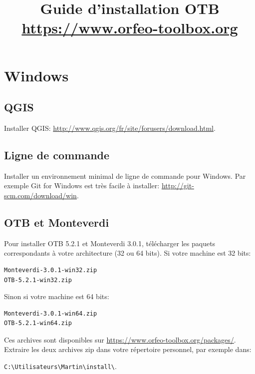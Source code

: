\documentclass[10pt,a4paper]{article}
\title{Guide d'installation OTB\\
  {\small\url{https://www.orfeo-toolbox.org}}
}
\begin{document}
\maketitle

\tableofcontents

\section{Windows}

\subsection{QGIS}
Installer QGIS: \url{http://www.qgis.org/fr/site/forusers/download.html}.
\subsection{Ligne de commande}
Installer un environnement minimal de ligne de commande pour Windows. Par exemple
Git for Windows est très facile à installer:
\url{http://git-scm.com/download/win}.

\subsection{OTB et Monteverdi}
Pour installer OTB 5.2.1 et Monteverdi 3.0.1, télécharger les paquets
correspondants à votre architecture (32 ou 64 bits). Si votre machine est 32
bits:

\begin{verbatim}
Monteverdi-3.0.1-win32.zip
OTB-5.2.1-win32.zip
\end{verbatim}

Sinon si votre machine est 64 bits:

\begin{verbatim}
Monteverdi-3.0.1-win64.zip
OTB-5.2.1-win64.zip
\end{verbatim}

Ces archives sont disponibles sur \url{https://www.orfeo-toolbox.org/packages/}.
Extraire les deux archives zip dans votre répertoire personnel, par exemple dans:\\
\begin{centering}
\texttt{C:{\textbackslash}Utilisateurs{\textbackslash}Martin{\textbackslash}install{\textbackslash}}.
\end{centering}
\end{document}
